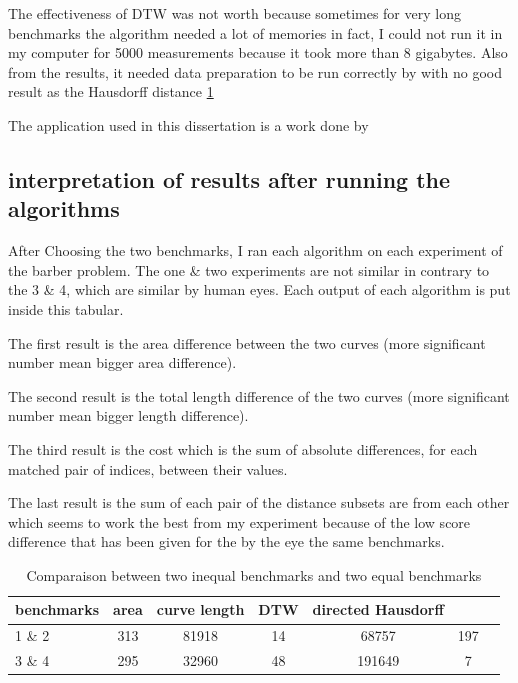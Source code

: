 \documentclass{article}
\begin{document}
The effectiveness of DTW was not worth because sometimes for very long benchmarks the algorithm needed a lot of memories in fact, I could not run it in my computer for 5000 measurements because it took more than 8 gigabytes.
Also from the results, it needed data preparation to be run correctly by with no good result as the Hausdorff distance \ref{result}

The application used in this dissertation is a work done by \cite{salvador2007toward}

\subsection{ interpretation of results after running the algorithms}

After Choosing the two benchmarks, I ran each algorithm on each experiment of the barber problem.
The one \& two experiments are not similar in contrary to the 3 \& 4, which are similar by human eyes.
Each output of each algorithm is put inside this tabular.


The first result is the area difference between the two curves (more significant number mean bigger area difference).

The second result is the total length difference of the two curves (more significant number mean bigger length difference).

The third result is the cost which is the sum of absolute differences, for each matched pair of indices, between their values.

The last result is the sum of each pair of the distance subsets are from each other which seems to work the best from my experiment because of the low score difference that has been given for the by the eye the same benchmarks.

\begin{table}[h!]
\begin{tabular}{|l|c|c|c|c|c|c|}
   \hline
   benchmarks  & area & curve length & DTW & directed Hausdorff \\
   \hline
   1 \&  2 & 313 & 81918 & 14 & 68757 & 197\\
   \hline
   3 \& 4  & 295 & 32960 & 48 & 191649 & 7 \\
   \hline
\end{tabular} \\ 
\caption{Comparaison between two inequal benchmarks and two equal benchmarks}
\label{result}
\end{table}
\end{document}
